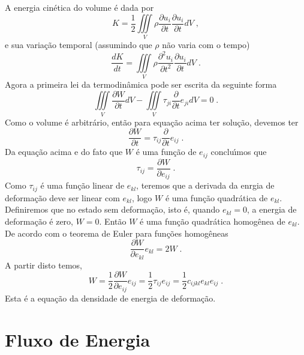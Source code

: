 A energia cin\'etica do volume \'e dada por
\begin{equation}
K=\frac{1}{2}\iiint\limits_{V}\rho\frac{\partial u_{i}}{\partial t}
\frac{\partial u_{i}}{\partial t}dV \;,
\end{equation}
e sua varia\c{c}\~ao temporal (assumindo que $\rho$ n\~ao varia com o tempo)
\begin{equation}
\frac{dK}{dt}=\iiint\limits_{V} \rho\frac{\partial^{2} u_{i}}{\partial t^{2}}
\frac{\partial u_{i}}{\partial t}dV \;.
\end{equation}
Agora a primeira lei da termodin\^amica pode ser escrita da seguinte forma
\begin{equation}
\iiint\limits_{V} \frac{\partial W}{\partial t} dV-
\iiint\limits_{V}
\tau_{ji}\frac{\partial}{\partial t}e_{ji}dV=0 \;.
\end{equation}
Como o volume \'e arbitr\'ario, ent\~ao para equa\c{c}\~ao acima ter solu\c{c}\~ao, devemos ter
\begin{equation}
\frac{\partial W}{\partial t} =\tau_{ij}\frac{\partial}{\partial t}e_{ij} \;.
\end{equation}
Da equa\c{c}\~ao acima e do fato que $W$ \'e uma fun\c{c}\~ao de $e_{ij}$ conclu\'\i mos que
\begin{equation}
\tau_{ij}=\frac{\partial W}{\partial e_{ij}} \;.
\end{equation}
Como $\tau_{ij}$ \'e uma fun\c{c}\~ao linear de $e_{kl}$,
teremos que a derivada da enrgia de deforma\c{c}\~ao
deve ser linear com $e_{kl}$, logo $W$ \'e uma fun\c{c}\~ao
quadr\'atica de $e_{kl}$. Definiremos
que no estado sem deforma\c{c}\~ao, isto \'e, quando
$e_{kl}=0$, a energia de deforma\c{c}\~ao \'e zero, $W=0$. Ent\~ao
$W$ \'e uma fun\c{c}\~ao quadr\'atica homog\^enea de $e_{kl}$. De acordo com o teorema de Euler
para fun\c{c}\~oes homog\^eneas
\begin{equation}
\frac{\partial W}{\partial e_{kl}}e_{kl}=2W \;.
\end{equation}
A partir disto temos,
\begin{equation}
W=\frac{1}{2}\frac{\partial W}{\partial e_{ij}}e_{ij}=\frac{1}{2}\tau_{ij}e_{ij}=
\frac{1}{2}c_{ijkl}e_{kl}e_{ij} \;.
\end{equation}
Esta \'e a equa\c{c}\~ao da densidade de energia de deforma\c{c}\~ao.

\section{Fluxo de Energia}

